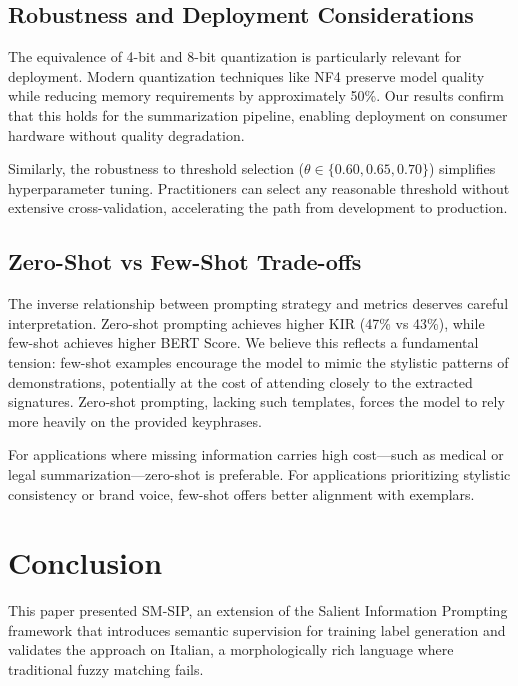 \documentclass[conference]{IEEEtran}
\begin{document}
\subsection{Robustness and Deployment Considerations}

The equivalence of 4-bit and 8-bit quantization is particularly relevant for deployment. Modern quantization techniques like NF4 preserve model quality while reducing memory requirements by approximately 50\%. Our results confirm that this holds for the summarization pipeline, enabling deployment on consumer hardware without quality degradation.

Similarly, the robustness to threshold selection ($\theta \in \{0.60, 0.65, 0.70\}$) simplifies hyperparameter tuning. Practitioners can select any reasonable threshold without extensive cross-validation, accelerating the path from development to production.

\subsection{Zero-Shot vs Few-Shot Trade-offs}

The inverse relationship between prompting strategy and metrics deserves careful interpretation. Zero-shot prompting achieves higher KIR (47\% vs 43\%), while few-shot achieves higher BERT Score. We believe this reflects a fundamental tension: few-shot examples encourage the model to mimic the stylistic patterns of demonstrations, potentially at the cost of attending closely to the extracted signatures. Zero-shot prompting, lacking such templates, forces the model to rely more heavily on the provided keyphrases.

For applications where missing information carries high cost---such as medical or legal summarization---zero-shot is preferable. For applications prioritizing stylistic consistency or brand voice, few-shot offers better alignment with exemplars.

\section{Conclusion}

This paper presented SM-SIP, an extension of the Salient Information Prompting framework that introduces semantic supervision for training label generation and validates the approach on Italian, a morphologically rich language where traditional fuzzy matching fails.
\end{document}

